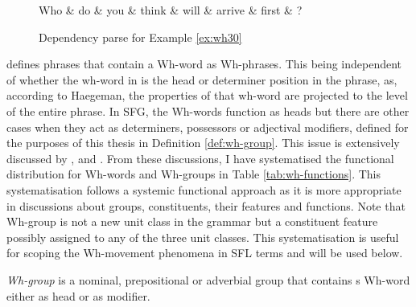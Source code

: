     \begin{figure}[!ht]
    	\centering
    	\begin{dependency}
    		\begin{deptext}[]
    			Who \& do \& you \& think \& will \& arrive \& first \& ?\\
    		\end{deptext}
    	\end{dependency}
    	\caption{Dependency parse for Example \ref{ex:wh30}}
    	\label{fig:e19}
    \end{figure}
    

    \citet[374]{Haegeman1991} defines phrases that contain a Wh-word as Wh-phrases. This being independent of whether the wh-word in is the head or determiner position in the phrase, as, according to Haegeman, the properties of that wh-word are projected to the level of the entire phrase. In SFG, the Wh-words function as heads but there are other cases when they act as determiners, possessors or adjectival modifiers, defined for the purposes of this thesis in Definition \ref{def:wh-group}. This issue is extensively discussed by \citet{Abney1987}, \citet{Quirk1985} and \citet{Halliday2013}. From these discussions, I have systematised the functional distribution for Wh-words and Wh-groups in Table \ref{tab:wh-functions}. This systematisation follows a systemic functional approach as it is more appropriate in discussions about groups, constituents, their features and functions. Note that Wh-group is not a new unit class in the grammar but a constituent feature possibly assigned to any of the three unit classes. This systematisation is useful for scoping the Wh-movement phenomena in SFL terms and will be used below.

    \begin{definition}[Wh-group]\label{def:wh-group}
        \textit{Wh-group} is a nominal, prepositional or adverbial group that contains s Wh-word either as head or as modifier. 
    \end{definition}

